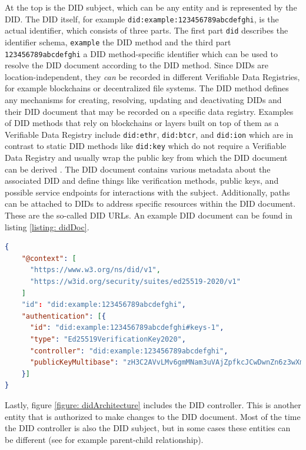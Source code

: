         At the top is the \ac{DID} subject, which can be any entity and is represented by the \ac{DID}. The \ac{DID} itself, for example \texttt{did:example:123456789abcdefghi}, is the actual identifier, which consists of three parts. The first part \texttt{did} describes the identifier schema, \texttt{example} the \ac{DID} method and the third part \texttt{123456789abcdefghi} a \ac{DID} method-specific identifier which can be used to resolve the \ac{DID} document according to the \ac{DID} method. Since \acp{DID} are location-independent, they \textit{can} be recorded in different Verifiable Data Registries, for example blockchains or decentralized file systems. The \ac{DID} method defines any mechanisms for creating, resolving, updating and deactivating \acp{DID} and their \ac{DID} document that may be recorded on a specific data registry. Examples of \ac{DID} methods that rely on blockchains or layers built on top of them as a Verifiable Data Registry include \texttt{did:ethr}, \texttt{did:btcr}, and \texttt{did:ion} which are in contrast to static \ac{DID} methods like \texttt{did:key} which do not require a Verifiable Data Registry and usually wrap the public key from which the DID document can be derived \cite[p. 171]{preukschat_self-sovereign_2021}. The \ac{DID} document contains various metadata about the associated \ac{DID} and define things like verification methods, public keys, and possible service endpoints for interactions with the subject. Additionally, paths can be attached to \acp{DID} to address specific resources within the \ac{DID} document. These are the so-called \ac{DID} URLs. An example \ac{DID} document can be found in listing \ref{listing: didDoc}. \cite{sporny_decentralized_2021}
        \newline
        
        \begin{lstlisting}[language=json, caption={\ac{DID} document example extracted from \cite{sporny_decentralized_2021}}, captionpos=b, label={listing: didDoc}]
{
    "@context": [
      "https://www.w3.org/ns/did/v1",
      "https://w3id.org/security/suites/ed25519-2020/v1"
    ]
    "id": "did:example:123456789abcdefghi",
    "authentication": [{
      "id": "did:example:123456789abcdefghi#keys-1",
      "type": "Ed25519VerificationKey2020",
      "controller": "did:example:123456789abcdefghi",
      "publicKeyMultibase": "zH3C2AVvLMv6gmMNam3uVAjZpfkcJCwDwnZn6z3wXmqPV"
    }]
}\end{lstlisting}
        
        Lastly, figure \ref{figure: didArchitecture} includes the \ac{DID} controller. This is another entity that is authorized to make changes to the \ac{DID} document. Most of the time the \ac{DID} controller is also the \ac{DID} subject, but in some cases these entities can be different (see for example parent-child relationship). \cite{sporny_decentralized_2021}
        
